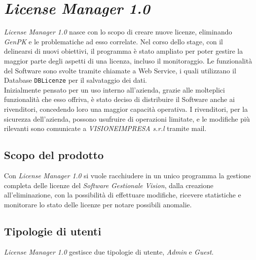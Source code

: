 
\chapter{\textit{License Manager 1.0}}
\label{cap:license-manager}

\textit{License Manager 1.0} nasce con lo scopo di creare nuove licenze, eliminando \textit{GenPK} e le problematiche ad esso correlate. Nel corso dello stage, con il delinearsi di nuovi obiettivi, il programma è stato ampliato per poter gestire la maggior parte degli aspetti di una licenza, incluso il monitoraggio. Le funzionalità del Software sono svolte tramite chiamate a Web Service, i quali utilizzano il Database \texttt{DBLicenze} per il salvataggio dei dati.
\\
Inizialmente pensato per un uso interno all'azienda, grazie alle molteplici funzionalità che esso offriva, è stato deciso di distribuire il Software anche ai rivenditori, concedendo loro una maggior capacità operativa.
I rivenditori, per la sicurezza dell'azienda, possono usufruire di operazioni limitate, e le modifiche più rilevanti sono comunicate a \textit{VISIONEIMPRESA s.r.l} tramite mail.


\section{Scopo del prodotto}

Con \textit{License Manager 1.0} si vuole racchiudere in un unico programma la gestione completa delle licenze del \textit{Software Gestionale Vision}, dalla creazione all'eliminazione, con la possibilità di effettuare modifiche, ricevere statistiche e monitorare lo stato delle licenze per notare possibili anomalie. 


\section{Tipologie di utenti}

\textit{License Manager 1.0} gestisce due tipologie di utente, \textit{Admin} e \textit{Guest}.

